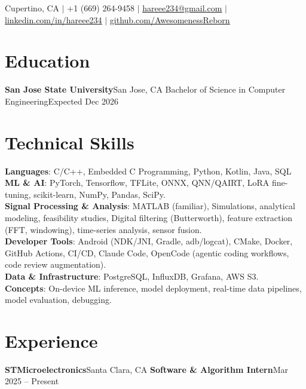 \documentclass[letterpaper,11pt]{article}
\begin{document}
\begin{center}
    \small Cupertino, CA $|$ +1 (669) 264-9458 $|$
    \href{mailto:hareee234@gmail.com}{\underline{hareee234@gmail.com}} $|$
    \href{https://www.linkedin.com/in/hareee234/}{\underline{linkedin.com/in/hareee234}} $|$
    \href{https://github.com/AwesomenessReborn}{\underline{github.com/AwesomenessReborn}}
\end{center}

\section{Education}
  \resumeSubHeadingListStart
    \resumeSubheading
      {\textbf{San Jose State University}}{San Jose, CA}
      {Bachelor of Science in Computer Engineering}{Expected Dec 2026}
      \resumeItemListStart
      \resumeItemListEnd
  \resumeSubHeadingListEnd

\section{Technical Skills}
 \resumeSubHeadingListStart
    \small{\item{
        \textbf{Languages}{: C/C++, Embedded C Programming,  Python, Kotlin, Java, SQL} \\
        \textbf{ML \& AI}{: PyTorch, Tensorflow, TFLite, ONNX, QNN/QAIRT, LoRA fine-tuning, scikit-learn, NumPy, Pandas, SciPy.} \\
        \textbf{Signal Processing \& Analysis}{: MATLAB (familiar), Simulations, analytical modeling, feasibility studies, Digital filtering (Butterworth), feature extraction (FFT, windowing), time-series analysis, sensor fusion.} \\
        \textbf{Developer Tools}{: Android (NDK/JNI, Gradle, adb/logcat), CMake, Docker, GitHub Actions, CI/CD, Claude Code, OpenCode (agentic coding workflows, code review augmentation).} \\
        \textbf{Data \& Infrastructure}{: PostgreSQL, InfluxDB, Grafana, AWS S3.} \\
        \textbf{Concepts}{: On-device ML inference, model deployment, real-time data pipelines, model evaluation, debugging.}
            }}
 \resumeSubHeadingListEnd

\section{Experience}
  \resumeSubHeadingListStart
    \resumeSubheading
      {\textbf{STMicroelectronics}}{Santa Clara, CA}
      {\textbf{Software \& Algorithm Intern}}{Mar 2025 -- Present}
      \resumeItemListStart
        
\end{document}
